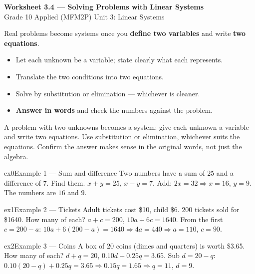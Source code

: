 \documentclass[11pt]{article}
\begin{document}
\begin{center}
{\LARGE\bfseries\color{titleblue}Worksheet 3.4 --- Solving Problems with Linear Systems}\\[2pt]
{\small Grade 10 Applied (MFM2P) \textperiodcentered{} Unit 3: Linear Systems}
\end{center}

\begin{ideabox}
Real problems become systems once you \textbf{define two variables} and write \textbf{two equations}.
\begin{itemize}[leftmargin=*,itemsep=2pt]
  \item Let each unknown be a variable; state clearly what each represents.
  \item Translate the two conditions into two equations.
  \item Solve by substitution or elimination --- whichever is cleaner.
  \item \textbf{Answer in words} and check the numbers against the problem.
\end{itemize}
\end{ideabox}

\begin{learnbox}
A problem with two unknowns becomes a system: give each unknown a variable and write two equations.
Use substitution or elimination, whichever suits the equations.
Confirm the answer makes sense in the original words, not just the algebra.
\end{learnbox}


\begin{example}{ex0}{Example 1 --- Sum and difference}
Two numbers have a sum of $25$ and a difference of $7$. Find them.
\soln $x+y=25$, $x-y=7$. Add: $2x=32\Rightarrow x=16$, $y=9$. The numbers are $16$ and $9$.
\end{example}

\begin{example}{ex1}{Example 2 --- Tickets}
Adult tickets cost \$10, child \$6. $200$ tickets sold for \$1640. How many of each?
\soln $a+c=200$, $10a+6c=1640$. From the first $c=200-a$: $10a+6(200-a)=1640\Rightarrow 4a=440\Rightarrow a=110$, $c=90$.
\end{example}

\begin{example}{ex2}{Example 3 --- Coins}
A box of $20$ coins (dimes and quarters) is worth \$3.65. How many of each?
\soln $d+q=20$, $0.10d+0.25q=3.65$. Sub $d=20-q$: $0.10(20-q)+0.25q=3.65\Rightarrow 0.15q=1.65\Rightarrow q=11$, $d=9$.
\end{example}
\end{document}
